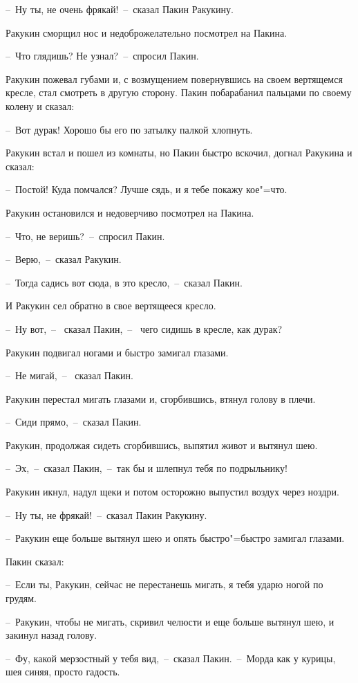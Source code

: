 --~Ну ты, не очень фрякай!~--~сказал Пакин Ракукину.

Ракукин сморщил нос и  недоброжелательно посмотрел на Пакина.

--~Что глядишь? Не узнал?~--~спросил Пакин.

Ракукин пожевал губами и, с возмущением повернувшись на своем вертящемся кресле, стал смотреть в другую сторону. 
Пакин побарабанил пальцами по своему колену и сказал:

--~Вот дурак!  Хорошо бы его по затылку палкой хлопнуть. 

Ракукин встал и пошел из комнаты, но Пакин быстро вскочил, догнал Ракукина и сказал:

--~Постой! Куда помчался? Лучше сядь, и я тебе покажу кое"=что.

Ракукин остановился и недоверчиво посмотрел на Пакина.

--~Что, не веришь?~--~спросил Пакин.

--~Верю,~--~сказал Ракукин.

--~Тогда садись вот сюда, в это кресло,~--~сказал Пакин.

И Ракукин сел обратно в свое  вертящееся кресло.

--~Ну  вот,~--~ сказал Пакин,~--~ чего сидишь
в кресле, как дурак?

Ракукин подвигал ногами и быстро замигал глазами.

--~Не мигай,~--~ сказал Пакин.

Ракукин перестал мигать глазами и, сгорбившись, втянул голову в плечи.

--~Сиди прямо,~--~сказал Пакин. 

Ракукин, продолжая сидеть сгорбившись, выпятил живот и вытянул шею. 

--~Эх,~--~сказал Пакин,~--~так бы и шлепнул тебя по подрыльнику!

Ракукин икнул, надул щеки и потом  осторожно выпустил воздух через ноздри.

--~Ну ты, не фрякай!~--~сказал Пакин Ракукину.

--~Ракукин еще больше вытянул шею и опять быстро"=быстро замигал глазами. 

Пакин сказал:

--~Если ты, Ракукин, сейчас не перестанешь мигать, я тебя ударю ногой по грудям.

--~Ракукин, чтобы не мигать, скривил челюсти и еще больше вытянул шею, и закинул назад голову.

--~Фу,  какой  мерзостный у тебя вид,~--~сказал Пакин.~--~Морда как у курицы, шея синяя, просто гадость.

